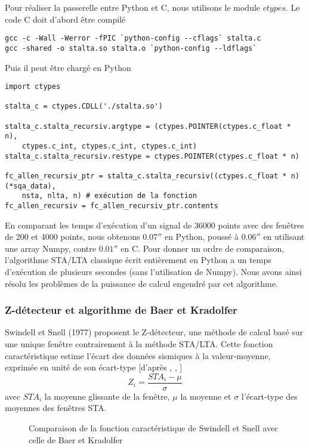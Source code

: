 \documentclass[a4paper, 11pt]{article} %
\begin{document}
Pour réaliser la passerelle entre Python et C, nous utilisons le module $ctypes$. Le code C doit d'abord être compilé
\begin{verbatim}
gcc -c -Wall -Werror -fPIC `python-config --cflags` stalta.c
gcc -shared -o stalta.so stalta.o `python-config --ldflags`
\end{verbatim}
Puis il peut être chargé en Python
\begin{verbatim}
import ctypes

stalta_c = ctypes.CDLL('./stalta.so')

stalta_c.stalta_recursiv.argtype = (ctypes.POINTER(ctypes.c_float * n), 
    ctypes.c_int, ctypes.c_int, ctypes.c_int)
stalta_c.stalta_recursiv.restype = ctypes.POINTER(ctypes.c_float * n)

fc_allen_recursiv_ptr = stalta_c.stalta_recursiv((ctypes.c_float * n)(*sqa_data), 
    nsta, nlta, n) # exécution de la fonction
fc_allen_recursiv = fc_allen_recursiv_ptr.contents
\end{verbatim}

En comparant les temps d'exécution d'un signal de 36000 points avec des fenêtres de 200 et 4000 points, nous obtenons $0.07 \second$ en Python, poussé à $0.06 \second$ en utilisant une array Numpy, contre $0.01 \second$ en C. Pour donner un ordre de comparaison, l'algorithme STA/LTA classique écrit entièrement en Python a un temps d'exécution de plusieurs secondes (sans l'utilisation de Numpy). Nous avons ainsi résolu les problèmes de la puissance de calcul engendré par cet algorithme.

\subsubsection{Z-détecteur et algorithme de Baer et Kradolfer}

Swindell et Snell (1977) proposent le Z-détecteur, une méthode de calcul basé sur une unique fenêtre contrairement à la méthode STA/LTA. Cette fonction caractéristique estime l’écart des données sismiques à la valeur-moyenne, exprimée en unité de son écart-type [d'après \cite{wither1998}, \cite{probatoire}, \cite{kuperkoch2010}]
\begin{equation}
   Z_i = \frac{STA_i-\mu}{\sigma}
\end{equation}
avec $STA_i$ la moyenne glissante de la fenêtre, $\mu$ la moyenne et $\sigma$ l'écart-type des moyennes des fenêtres STA.

\begin{figure}[!ht]
    \centering
    
    \caption{Comparaison de la fonction caractéristique de Swindell et Snell avec celle de Baer et Kradolfer}
    \label{fig:fc-z}
\end{figure}
\end{document}
